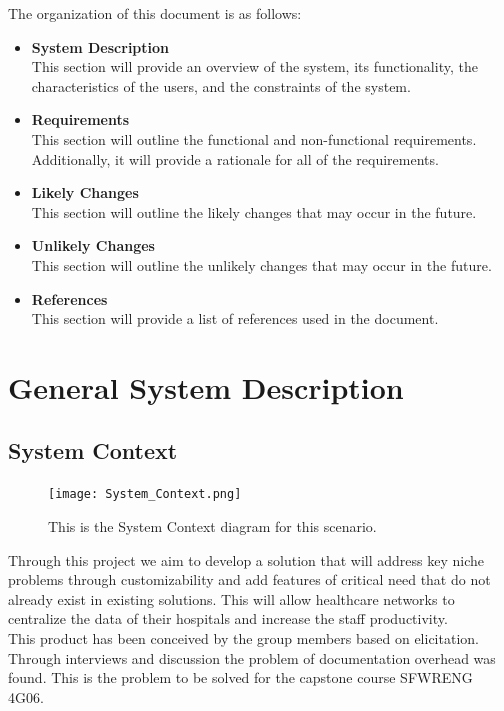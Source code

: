\documentclass[12pt]{article}
\begin{document}
The organization of this document is as follows:
\begin{itemize}
  \item \textbf{System Description}\\
  This section will provide an overview of the system, its functionality, the characteristics of the users, and the constraints of the system.
  \item \textbf{Requirements}\\
  This section will outline the functional and non-functional requirements. Additionally, it will provide a rationale for all of the requirements.
  \item \textbf{Likely Changes}\\
  This section will outline the likely changes that may occur in the future.
  \item \textbf{Unlikely Changes}\\
  This section will outline the unlikely changes that may occur in the future.
  \item \textbf{References}\\
  This section will provide a list of references used in the document.
\end{itemize}

\section{General System Description} \label{sec_GeneralSystemDescription}

\subsection{System Context} \label{sec_SystemContext}
\begin{figure}[H]
  \texttt{[image: System\_Context.png]}
  \caption{This is the System Context diagram for this scenario.}
\end{figure}
Through this project we aim to develop a solution that will address key niche problems through customizability and add features of critical need that do not already exist in existing solutions. This will allow healthcare networks to centralize the data of their hospitals and increase the staff productivity.\\

\noindent This product has been conceived by the group members based on elicitation. Through interviews and discussion the problem of documentation overhead was found. This is the problem to be solved for the capstone course SFWRENG 4G06.
\end{document}
